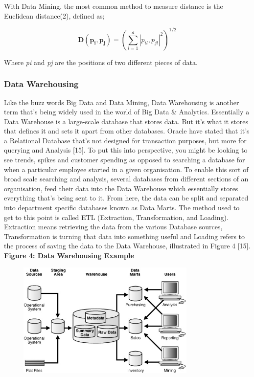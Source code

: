 \documentclass[10pt,journal,compsoc]{IEEEtran}
\begin{document}
With Data Mining, the most common method to measure distance is the Euclidean distance(2), defined as;

\begin{equation}
\mathbf{D(p_{i}, p_{j})} = 
\left(
\sum_{l=1}^{d} |p_{il}, p_{jl}|^2
\right)^{1/2}
\end{equation}

Where \textit{pi} and \textit{pj} are the positions of two different pieces of data.

\subsubsection{Data Warehousing}
Like the buzz words Big Data and Data Mining, Data Warehousing is another term that's being widely used in the world of Big Data \& Analytics. Essentially a Data Warehouse is a large-scale database that stores data. But it's what it stores that defines it and sets it apart from other databases. Oracle have stated that it's a Relational Database that's not designed for transaction purposes, but more for querying and Analysis [15]. To put this into perspective, you might be looking to see trends, spikes and customer spending as opposed to searching a database for when a particular employee started in a given organisation. To enable this sort of broad scale searching and analysis, several databases from different sections of an organisation, feed their data into the Data Warehouse which essentially stores everything that's being sent to it. From here, the data can be split and separated into department specific databases known as Data Marts. The method used to get to this point is called ETL (Extraction, Transformation, and Loading). Extraction means retrieving the data from the various Database sources, Transformation is turning that data into something useful and Loading refers to the process of saving the data to the Data Warehouse, illustrated in Figure 4 [15].\\

\textbf{Figure 4: Data Warehousing Example}
\begin{figure}[ht!]
	\centering
	\includegraphics[width=88mm]{dwarehouse.jpg}
\end{figure}
\end{document}
